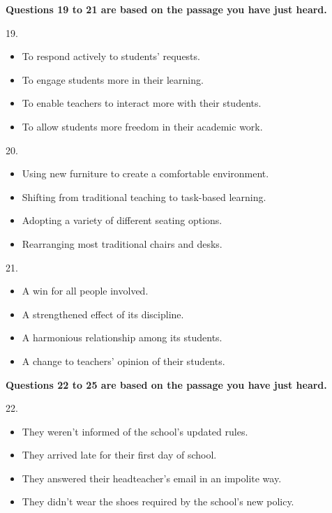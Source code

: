 \documentclass[UTF8,11pt]{ctexart}
\begin{document}
\textbf{Questions 19 to 21 are based on the passage you have just heard.}


19.


\begin{itemize}[leftmargin=2em,itemsep=.2em,topsep=.4em]\item[A.] To respond actively to students’ requests.
\item[B.] To engage students more in their learning.
\item[C.] To enable teachers to interact more with their students.
\end{itemize}

\begin{itemize}[leftmargin=2em,itemsep=.2em,topsep=.4em]\item[D.] To allow students more freedom in their academic work.
\end{itemize}

20.


\begin{itemize}[leftmargin=2em,itemsep=.2em,topsep=.4em]\item[A.] Using new furniture to create a comfortable environment.
\item[B.] Shifting from traditional teaching to task-based learning.
\item[C.] Adopting a variety of different seating options.
\item[D.] Rearranging most traditional chairs and desks.
\end{itemize}

21.


\begin{itemize}[leftmargin=2em,itemsep=.2em,topsep=.4em]\item[A.] A win for all people involved.
\item[B.] A strengthened effect of its discipline.
\item[C.] A harmonious relationship among its students.
\item[D.] A change to teachers’ opinion of their students.
\end{itemize}

\textbf{Questions 22 to 25 are based on the passage you have just heard.}


22.


\begin{itemize}[leftmargin=2em,itemsep=.2em,topsep=.4em]\item[A.] They weren’t informed of the school’s updated rules.
\item[B.] They arrived late for their first day of school.
\item[C.] They answered their headteacher’s email in an impolite way.
\item[D.] They didn’t wear the shoes required by the school’s new policy.
\end{itemize}
\end{document}
